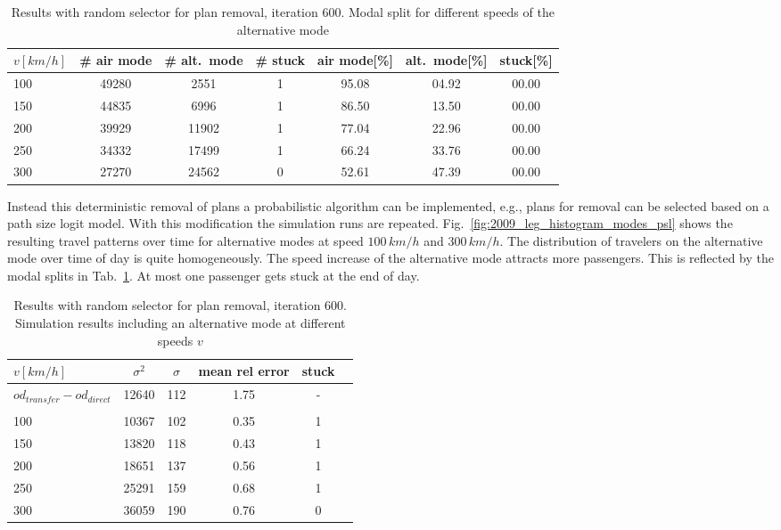 \begin{table}[t]
	\centering
	\begin{tabular}{@{}l|ccc|ccc@{}}
		$v [km/h]$	& \# air mode  & \# alt.~mode & \# stuck & air mode[\%]  & alt.~mode[\%] & stuck[\%] \\
		\hline 
		100 & 49280 & 2551 & 1 & 95.08 & 04.92 & 00.00\\	%
		150 & 44835 & 6996 & 1 & 86.50 & 13.50 & 00.00\\	%
		200 & 39929 & 11902 & 1 & 77.04 & 22.96 & 00.00\\	%
		250 & 34332 & 17499 & 1 & 66.24 & 33.76 & 00.00\\	%
		300 & 27270 & 24562 & 0 & 52.61 & 47.39 & 00.00\\	%
	\end{tabular}
	\caption{Results with random selector for plan removal, iteration 600. Modal split for different speeds of the alternative mode}
	\label{tab:2009_results_train_modal_split_psl}
\end{table}


Instead this deterministic removal of plans a probabilistic algorithm can be implemented, e.g., plans for removal can be selected based on a path size logit model. 
With this modification the simulation runs are repeated. 
Fig.~\ref{fig:2009_leg_histogram_modes_psl} shows the resulting travel patterns over time for alternative modes at speed $100 \, km/h$ and $300 \, km/h$.  
The distribution of travelers on the alternative mode over time of day is quite homogeneously. 
The speed increase of the alternative mode attracts more passengers. 
This is reflected by the modal splits in Tab.~\ref{tab:2009_results_train_modal_split_psl}. 
At most one passenger gets stuck at the end of day. 

\begin{table}[t]
\centering
		\begin{tabular}{@{}l|ccccc@{}}
			$v [km/h]$ & $\sigma^2$ & $\sigma$ & mean rel error  & stuck \\
\hline
 $od_{transfer} - od_{direct}$ &  12640 & 112 & 1.75 & - \\
 \\
 100	& 10367 & 102 & %
 0.35%
 &  %
 1
 \\	%
 150	& 13820 & 118 & 0.43 &  1 \\	%
 200 & 18651 & 137 & 0.56 &  1 \\	%
 250 & 25291 & 159 & 0.68 & 1 \\	%
 300 & 36059 & 190 & 0.76 & 0 \\	%
		\end{tabular}
		\caption{Results with random selector for plan removal, iteration 600. Simulation results including an alternative mode at different speeds $v$}
		\label{tab:2009_results_alternative_mode_psl}
\end{table}

